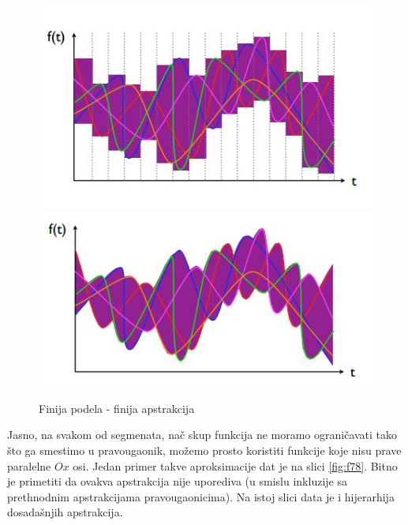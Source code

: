\documentclass[a4paper]{article}
\begin{document}
\begin{figure}[h!]
\begin{center}
\includegraphics[scale=0.3]{f5.JPG}
\includegraphics[scale=0.3]{f6.JPG}
\end{center}
\caption{Finija podela - finija apstrakcija}
\label{fig:f56}
\end{figure} \newline
Jasno, na svakom od segmenata, nač skup funkcija ne moramo ograničavati tako što ga smestimo u pravougaonik, možemo prosto koristiti funkcije koje nisu prave paralelne $Ox$ osi. Jedan primer takve aproksimacije dat je na slici \ref{fig:f78}. Bitno je primetiti da ovakva apstrakcija nije uporediva (u smislu inkluzije sa prethnodnim apstrakcijama pravougaonicima). Na istoj slici data je i hijerarhija dosadašnjih apstrakcija.
\end{document}
